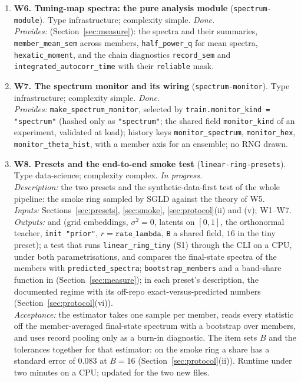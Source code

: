 \documentclass[11pt,a4paper]{article}
\newcommand{\code}[1]{\texttt{#1}}
\begin{document}
\begin{enumerate}[leftmargin=2em,itemsep=5pt]
  \item \textbf{W6. Tuning-map spectra: the pure analysis module} (\code{spectrum-module}). Type infrastructure; complexity simple. \emph{Done.}\\
  \emph{Provides:}  (Section~\ref{sec:measure}): the spectra and their summaries, \code{member\_mean\_sem} across members, \code{half\_power\_q} for mean spectra, \code{hexatic\_moment}, and the chain diagnostics \code{record\_sem} and \code{integrated\_autocorr\_time} with their \code{reliable} mask.
  \item \textbf{W7. The spectrum monitor and its wiring} (\code{spectrum-monitor}). Type infrastructure; complexity simple. \emph{Done.}\\
  \emph{Provides:} \code{make\_spectrum\_monitor}, selected by \code{train.monitor\_kind = "spectrum"} (hashed only as \code{"spectrum"}; the shared field \code{monitor\_kind} of an experiment, validated at load); history keys \code{monitor\_spectrum}, \code{monitor\_hex}, \code{monitor\_theta\_hist}, with a member axis for an ensemble; no RNG drawn.
  \item \textbf{W8. Presets and the end-to-end smoke test} (\code{linear-ring-presets}). Type data-science; complexity complex. \emph{In progress.}\\
  \emph{Description:} the two presets and the synthetic-data-first test of the whole pipeline: the smoke ring sampled by SGLD against the theory of W5.\\
  \emph{Inputs:} Sections~\ref{sec:presets}, \ref{sec:smoke}, \ref{sec:protocol}(ii) and (v); W1--W7.\\
  \emph{Outputs:}  and  (grid embeddings, $\sigma^2 = 0$, latents on $[0, 1]$, the orthonormal teacher, \code{init "prior"}, $r = \code{rate\_lambda}$, \code{B} a shared field, $16$ in the tiny preset); a test that runs \code{linear\_ring\_tiny} (S1) through the CLI on a CPU, under both parametrisations, and compares the final-state spectra of the members with \code{predicted\_spectra}; \code{bootstrap\_members} and a band-share function in  (Section~\ref{sec:measure}); in each preset's description, the documented regime with its off-repo exact-versus-predicted numbers (Section~\ref{sec:protocol}(vi)).\\
  \emph{Acceptance:} the estimator takes one sample per member, reads every statistic off the member-averaged final-state spectrum with a bootstrap over members, and uses record pooling only as a burn-in diagnostic. The item sets $B$ and the tolerances together for that estimator: on the smoke ring a share has a standard error of $0.083$ at $B = 16$ (Section~\ref{sec:protocol}(ii)). Runtime under two minutes on a CPU;  updated for the two new files.

\end{enumerate}
\end{document}
